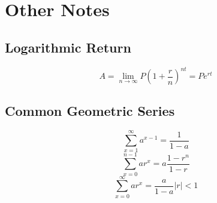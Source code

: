 \section{Other Notes}
	\subsection{Logarithmic Return}
		\begin{equation}
			A= \lim\limits_{n\rightarrow\infty} P\left(1+\frac{r}{n}\right)^{nt} = Pe^{rt}
		\end{equation}
		
	\subsection{Common Geometric Series}
		\[\sum_{x=1}^{\infty} a^{x-1} = \frac{1}{1-a} \]
		\[\sum_{x=0}^{n-1} ar^{x} = a\frac{1-r^n}{1-r} \]
		\[\sum_{x=0}^{\infty} ar^{x} = \frac{a}{1-a}|r|<1 \]
		